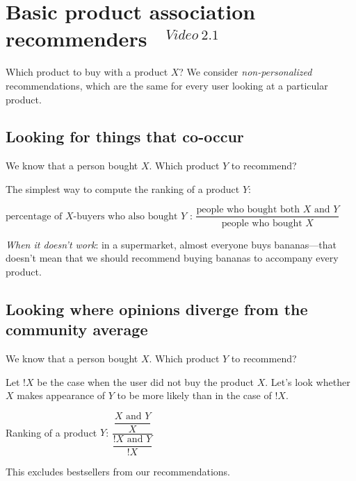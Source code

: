 \documentclass[11pt]{article}
\begin{document}



\section{Basic product association recommenders ~$^{Video~2.1}$}

Which product to buy with a product $X$? 
We consider \emph{non-personalized} recommendations,
which are the same for every user looking at a particular product.

\subsection{Looking for things that co-occur}

We know that a person bought $X$. Which product $Y$ to recommend?

The simplest way to compute the ranking of a product $Y$:

$\text{percentage of $X$-buyers who also bought $Y$ : }
\dfrac{\text{people who bought both $X$ and $Y$}}
{\text{people who bought $X$}}$

\emph{When it doesn't work}: in a supermarket, almost everyone buys bananas---that doesn't mean that we should recommend buying bananas to accompany every product.

\subsection{Looking where opinions diverge from the community average}

We know that a person bought $X$. Which product $Y$ to recommend?

Let $!X$ be the case when the user did not buy the product $X$. Let's look whether $X$ makes appearance of $Y$ to be more likely than in the case of $!X$.

Ranking of a product $Y$:  
$\dfrac{\dfrac{X\text{ and }Y}{X}}
{\dfrac{!X\text{ and }Y}{!X}}$ 

This excludes bestsellers from our recommendations.
\end{document}
